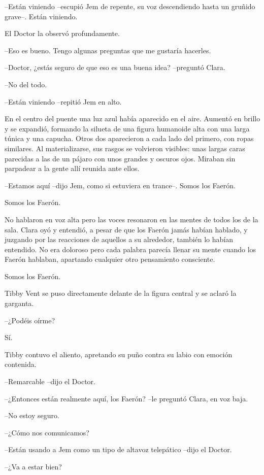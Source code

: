 {--Están viniendo --escupió Jem de repente, su voz descendiendo hasta un
gruñido grave--. Están viniendo.}

{El Doctor la observó profundamente.}

{--Eso es bueno. Tengo algunas preguntas que me gustaría hacerles.}

{--Doctor, ¿estás seguro de que eso es una buena idea? --preguntó
Clara.}

{--No del todo.}

{--Están viniendo --repitió Jem en alto.}

{En el centro del puente una luz azul había aparecido en el aire. Aumentó
 en brillo y se expandió, formando la silueta de una figura humanoide
 alta con una larga túnica y una capucha. Otros dos aparecieron a cada
 lado del primero, con ropas similares. Al materializarse, sus rasgos se
 volvieron visibles: unas largas caras parecidas a las de un pájaro con
 unos grandes y oscuros ojos. Miraban sin parpadear a la gente allí
reunida ante ellos.}

{--Estamos aquí --dijo Jem, como si estuviera en trance--. Somos los
Faerón.}

{Somos los Faerón.}

{No hablaron en voz alta pero las voces resonaron en las mentes de todos
 los de la sala. Clara oyó y entendió, a pesar de que los Faerón jamás
 habían hablado, y juzgando por las reacciones de aquellos a su
 alrededor, también lo habían entendido. No era doloroso pero cada
 palabra parecía llenar su mente cuando los Faerón hablaban, apartando
cualquier otro pensamiento consciente.}

{Somos los Faerón.}

{Tibby Vent se puso directamente delante de la figura central y se aclaró
la garganta.}

{--¿Podéis oírme?}

{Sí.}

{Tibby contuvo el aliento, apretando su puño contra su labio con emoción
contenida.}

{--Remarcable --dijo el Doctor.}

{--¿Entonces están realmente aquí, los Faerón? --le preguntó Clara, en
voz baja.}

{--No estoy seguro.}

{--¿Cómo nos comunicamos?}

{--Están usando a Jem como un tipo de altavoz telepático --dijo el
Doctor.}

{--¿Va a estar bien?}

